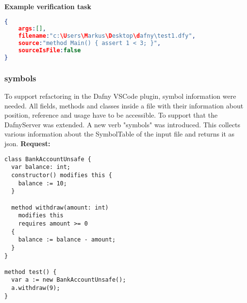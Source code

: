 \textbf{Example verification task}
\begin{lstlisting}[language=json,firstnumber=1]
{
	args:[],
	filename:"c:\Users\Markus\Desktop\dafny\test1.dfy",
	source:"method Main() {	assert 1 < 3; }",
	sourceIsFile:false
}

\end{lstlisting}

\subsubsection{symbols}
To support refactoring in the Dafny VSCode plugin, symbol information were needed. All fields, methods and classes inside a file with their information about position, reference and usage have to be accessible. To support that the DafnyServer was extended. A new verb "symbols" was introduced. This collects various information about the SymbolTable of the input file and returns it as json. 
\newline\newline
\textbf{Request: }

\begin{lstlisting}[language=dafny]
class BankAccountUnsafe {
  var balance: int;
  constructor() modifies this { 
    balance := 10;
  }
  
  method withdraw(amount: int) 
    modifies this
    requires amount >= 0
  {   
    balance := balance - amount; 
  } 
}   

method test() { 
  var a := new BankAccountUnsafe(); 
  a.withdraw(9);  
}   
\end{lstlisting}

